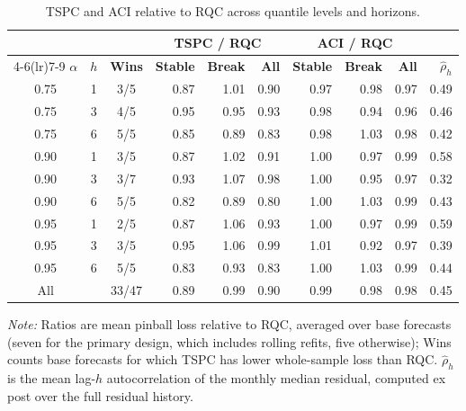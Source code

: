 \begin{table}[t]
\caption{TSPC and ACI relative to RQC across quantile levels and horizons.\label{tab:designs}}
\centering\footnotesize\setlength{\tabcolsep}{2.6pt}
\begin{tabular*}{\columnwidth}{@{\extracolsep\fill}ccc rrr rrr r@{}}
\toprule
 & & & \multicolumn{3}{c}{\textbf{TSPC / RQC}} & \multicolumn{3}{c}{\textbf{ACI / RQC}} & \\
\cmidrule(lr){4-6}\cmidrule(lr){7-9}
$\alpha$ & $h$ & \textbf{Wins} & \textbf{Stable} & \textbf{Break} & \textbf{All} & \textbf{Stable} & \textbf{Break} & \textbf{All} & $\widehat\rho_h$ \\
\midrule
0.75 & 1 & 3/5 & 0.87 & 1.01 & 0.90 & 0.97 & 0.98 & 0.97 & 0.49 \\
0.75 & 3 & 4/5 & 0.95 & 0.95 & 0.93 & 0.98 & 0.94 & 0.96 & 0.46 \\
0.75 & 6 & 5/5 & 0.85 & 0.89 & 0.83 & 0.98 & 1.03 & 0.98 & 0.42 \\
0.90 & 1 & 3/5 & 0.87 & 1.02 & 0.91 & 1.00 & 0.97 & 0.99 & 0.58 \\
0.90 & 3 & 3/7 & 0.93 & 1.07 & 0.98 & 1.00 & 0.95 & 0.97 & 0.32 \\
0.90 & 6 & 5/5 & 0.82 & 0.89 & 0.80 & 1.00 & 1.03 & 0.99 & 0.43 \\
0.95 & 1 & 2/5 & 0.87 & 1.06 & 0.93 & 1.00 & 0.97 & 0.99 & 0.59 \\
0.95 & 3 & 3/5 & 0.95 & 1.06 & 0.99 & 1.01 & 0.92 & 0.97 & 0.39 \\
0.95 & 6 & 5/5 & 0.83 & 0.93 & 0.83 & 1.00 & 1.03 & 0.99 & 0.44 \\
\midrule
All &  & 33/47 & 0.89 & 0.99 & 0.90 & 0.99 & 0.98 & 0.98 & 0.45 \\
\bottomrule
\end{tabular*}
\begin{tablenotes}
\item \textit{Note:} Ratios are mean pinball loss relative to RQC, averaged over base forecasts (seven for the primary design, which includes rolling refits, five otherwise); Wins counts base forecasts for which TSPC has lower whole-sample loss than RQC. $\widehat\rho_h$ is the mean lag-$h$ autocorrelation of the monthly median residual, computed ex post over the full residual history.
\end{tablenotes}
\end{table}

